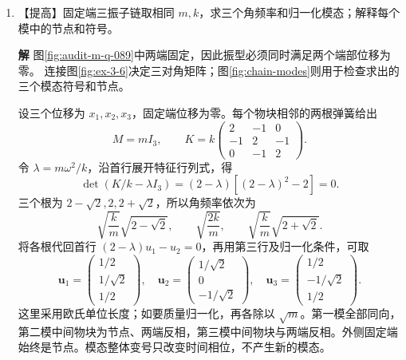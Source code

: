 \documentclass[11pt,openany,fontset=fandol]{ctexbook}
\theoremstyle{plain}\newtheorem{theorem}{定理}[chapter]\newtheorem{proposition}[theorem]{命题}
\theoremstyle{definition}\newtheorem{definition}{定义}[chapter]\newtheorem{example}{例}[chapter]
\theoremstyle{remark}\newtheorem*{remark}{说明}
\newcommand{\SolutionStart}{\par\nobreak\medskip\nobreak\noindent\textbf{解}\quad\ignorespaces}
\newenvironment{solution}{\SolutionStart}{\par\medskip}
\newcommand{\vct}[1]{\bm{#1}}\newcommand{\Rea}{\operatorname{Re}}\newcommand{\Ima}{\operatorname{Im}}
\begin{document}
\begin{enumerate}[label=3.\arabic*]
\begin{solution}
相对模中两物体位移方向相反、振幅比为2，正好使质量加权位移之和为零；图中的整体平移模则不改变弹簧伸长。
\end{solution}

\item \begin{minipage}[t]{\linewidth}
【提高】固定端三振子链取相同 $m,k$，求三个角频率和归一化模态；解释每个模中的节点和符号。

\end{minipage}

\begin{solution}
图\ref{fig:audit-m-q-089}中两端固定，因此振型必须同时满足两个端部位移为零。
连接图\ref{fig:ex-3-6}决定三对角矩阵；图\ref{fig:chain-modes}则用于检查求出的三个模态符号和节点。

设三个位移为 $x_1,x_2,x_3$，固定端位移为零。每个物块相邻的两根弹簧给出
\[
M=mI_3,\qquad K=k\begin{pmatrix}2&-1&0\\-1&2&-1\\0&-1&2\end{pmatrix}.
\]
令 $\lambda=m\omega^2/k$，沿首行展开特征行列式，得
\[
\det(K/k-\lambda I_3)
=(2-\lambda)[(2-\lambda)^2-2]=0.
\]
三个根为 $2-\sqrt2,2,2+\sqrt2$，所以角频率依次为
\[
\sqrt{\frac km}\sqrt{2-\sqrt2},\qquad
\sqrt{\frac{2k}m},\qquad
\sqrt{\frac km}\sqrt{2+\sqrt2}.
\]
将各根代回首行 $(2-\lambda)u_1-u_2=0$，再用第三行及归一化条件，可取
\[
\vct u_1=\begin{pmatrix}1/2\\1/\sqrt2\\1/2\end{pmatrix},\quad
\vct u_2=\begin{pmatrix}1/\sqrt2\\0\\-1/\sqrt2\end{pmatrix},\quad
\vct u_3=\begin{pmatrix}1/2\\-1/\sqrt2\\1/2\end{pmatrix}.
\]
这里采用欧氏单位长度；如要质量归一化，再各除以 $\sqrt m$。第一模全部同向，第二模中间物块为节点、两端反相，第三模中间物块与两端反相。外侧固定端始终是节点。模态整体变号只改变时间相位，不产生新的模态。


\end{solution}
\end{enumerate}
\end{document}
